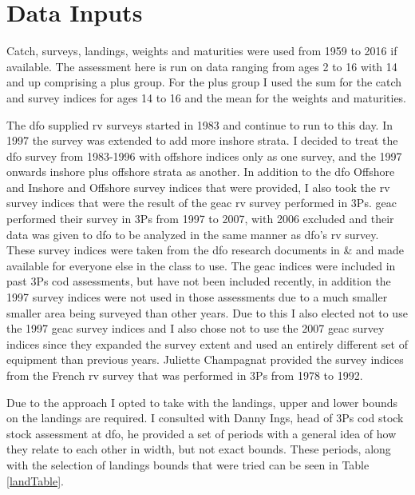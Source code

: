 \documentclass[11pt]{article}\usepackage[]{graphicx}\usepackage[]{color}
\begin{document}
\section{Data Inputs} 
Catch, surveys, landings, weights and maturities were used from 1959 to 2016 if available. The assessment here is run on data ranging from ages 2 to 16 with 14 and up comprising a plus group. For the plus group I used the sum for the catch and survey indices for ages 14 to 16 and the mean for the weights and maturities.

The \acrshort{dfo} supplied \acrshort{rv} surveys started in 1983 and continue to run to this day. In 1997 the survey was extended to add more inshore strata. I decided to treat the \acrshort{dfo} survey from 1983-1996 with offshore indices only as one survey, and the 1997 onwards inshore plus offshore strata as another. In addition to the \acrshort{dfo} Offshore and Inshore and Offshore survey indices that were provided, I also took the \acrshort{rv} survey indices that were the result of the \acrfull{geac} \acrshort{rv} survey performed in 3Ps. \acrshort{geac} performed their survey in 3Ps from 1997 to 2007, with 2006 excluded and their data was given to \acrshort{dfo} to be analyzed in the same manner as \acrshort{dfo}'s \acrshort{rv} survey. These survey indices were taken from the \acrshort{dfo} research documents in \cite{mcclintock2005year} \& \cite{mcclintock2011fall} and made available for everyone else in the class to use. The \acrshort{geac} indices were included in past 3Ps cod assessments, but have not been included recently, in addition the 1997 survey indices were not used in those assessments due to a much smaller smaller area being surveyed than other years\cite{brattey2005assessment}. Due to this I also elected not to use the 1997 \acrshort{geac} survey indices and I also chose not to use the 2007 \acrshort{geac} survey indices since they expanded the survey extent and used an entirely different set of equipment than previous years. Juliette Champagnat provided the survey indices from the French \acrshort{rv} survey that was performed in 3Ps from 1978 to 1992.

Due to the approach I opted to take with the landings, upper and lower bounds on the landings are required. I consulted with Danny Ings, head of 3Ps cod stock stock assessment at \acrshort{dfo}, he provided a set of periods with a general idea of how they relate to each other in width, but not exact bounds. These periods, along with the selection of landings bounds that were tried can be seen in Table \ref{landTable}. 
\end{document}
